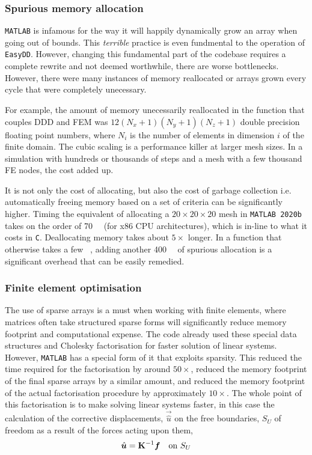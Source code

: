 \subsubsection{Spurious memory allocation}

\texttt{MATLAB} is infamous for the way it will happily dynamically grow an array when going out of bounds. This \emph{terrible} practice is even fundmental to the operation of \texttt{EasyDD}. However, changing this fundamental part of the codebase requires a complete rewrite and not deemed worthwhile, there are worse bottlenecks. However, there were many instances of memory reallocated or arrays grown every cycle that were completely unecessary.

For example, the amount of memory unecessarily reallocated in the function that couples DDD and FEM was $12(N_x + 1)(N_y + 1)(N_z + 1)$ double precision floating point numbers, where $N_i$ is the number of elements in dimension $i$ of the finite domain. The cubic scaling is a performance killer at larger mesh sizes. In a simulation with hundreds or thousands of steps and a mesh with a few thousand FE nodes, the cost added up.

It is not only the cost of allocating, but also the cost of garbage collection \cite{hanson1990fast} i.e. automatically freeing memory based on a set of criteria can be significantly higher. Timing the equivalent of allocating a $20 \times 20 \times 20$ mesh in \texttt{MATLAB 2020b} takes on the order of \SI{70}{\micro\sec} (for x86 CPU architectures), which is in-line to what it costs in \texttt{C}. Deallocating memory takes about $5 \times$ longer. In a function that otherwise takes a few \si{\milli\sec}, adding another \SI{400}{\micro\sec} of spurious allocation is a significant overhead that can be easily remedied.


\subsubsection{Finite element optimisation}

The use of sparse arrays is a must when working with finite elements, where matrices often take structured sparse forms will significantly reduce memory footprint and computational expense. The code already used these special data structures and Cholesky factorisation for faster solution of linear systems. However, \texttt{MATLAB} has a special form of it that exploits sparsity. This reduced the time required for the factorisation by around $50\times$, reduced the memory footprint of the final sparse arrays by a similar amount, and reduced the memory footprint of the actual factorisation procedure by approximately $10 \times$. The whole point of this factorisation is to make solving linear systems faster, in this case the calculation of the corrective displacements, $\vec{\hat{u}}$ on the free boundaries, $S_U$ of freedom as a result of the forces acting upon them,
\begin{align}
    \vec{\hat{u}} = \mtx{K}^{-1} \vec{f}\quad \text{on } S_U
\end{align}

